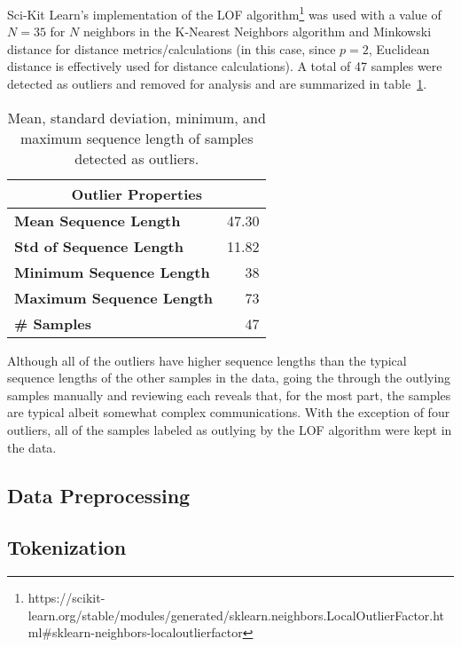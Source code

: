 \documentclass[12pt]{article}
\begin{document}
Sci-Kit Learn's implementation of the LOF
algorithm\footnote{https://scikit-learn.org/stable/modules/generated/sklearn.neighbors.LocalOutlierFactor.html\#sklearn-neighbors-localoutlierfactor}
was used with a value of \(N = 35\) for \(N\) neighbors in the K-Nearest Neighbors algorithm and Minkowski distance for distance metrics/calculations
(in this case, since \(p=2\), Euclidean distance is effectively used for distance calculations). A total of 47 samples were detected as outliers and
removed for analysis and are summarized in table~\ref{table:outlier_stats}.

\begin{table}[h!]
    \centering
    \begin{tabular}{l | r}
        \toprule
        \multicolumn{2}{c}{Outlier Properties}   \\
        \midrule
        \textbf{Mean Sequence Length}    & 47.30 \\
        \textbf{Std of Sequence Length}  & 11.82 \\
        \textbf{Minimum Sequence Length} & 38    \\
        \textbf{Maximum Sequence Length} & 73    \\
        \textbf{\# Samples}              & 47    \\
        \bottomrule
    \end{tabular}
    \label{table:outlier_stats}
    \caption{Mean, standard deviation, minimum, and maximum sequence length of samples detected as outliers.}
\end{table}

Although all of the outliers have higher sequence lengths than the typical sequence lengths of the other samples in the data, going the through
the outlying samples manually and reviewing each reveals that, for the most part, the samples are typical albeit somewhat complex communications.
With the exception of four outliers, all of the samples labeled as outlying by the LOF algorithm were kept in the data.

\subsection{Data Preprocessing}


\subsection{Tokenization}

\newpage


\end{document}
